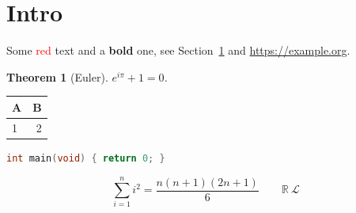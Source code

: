 \documentclass[11pt]{article}
\newtheorem{thm}{Theorem}
\begin{document}
\section{Intro}\label{s:intro}
Some \textcolor{red}{red} text and a \textbf{bold} one, see Section~\ref{s:intro} and \url{https://example.org}.
\begin{thm}[Euler]
  $e^{i\pi}+1=0$.
\end{thm}
\begin{tabular}{lr}\toprule A & B\\\midrule 1 & 2\\\bottomrule\end{tabular}
\begin{lstlisting}[language=C]
int main(void) { return 0; }
\end{lstlisting}
$$\sum_{i=1}^n i^2 = \frac{n(n+1)(2n+1)}{6}\qquad \mathbb{R}\ \mathcal{L}$$
\end{document}
